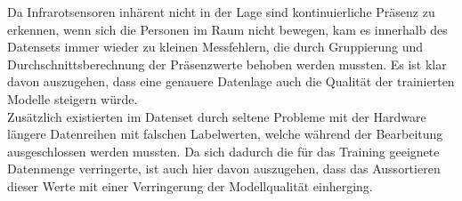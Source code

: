 Da Infrarotsensoren inhärent nicht in der Lage sind kontinuierliche Präsenz zu erkennen, wenn sich die Personen
im Raum nicht bewegen, kam es innerhalb des Datensets immer wieder zu kleinen Messfehlern, die durch Gruppierung
und Durchschnittsberechnung der Präsenzwerte behoben werden mussten. Es ist klar davon auszugehen, dass eine 
genauere Datenlage auch die Qualität der trainierten Modelle steigern würde.\\
Zusätzlich existierten im Datenset durch seltene Probleme mit der Hardware längere Datenreihen mit falschen 
Labelwerten, welche während der Bearbeitung ausgeschlossen werden mussten. Da sich dadurch die für das Training 
geeignete Datenmenge verringerte, ist auch hier davon auszugehen, dass das Aussortieren dieser Werte
mit einer Verringerung der Modellqualität einherging. 
